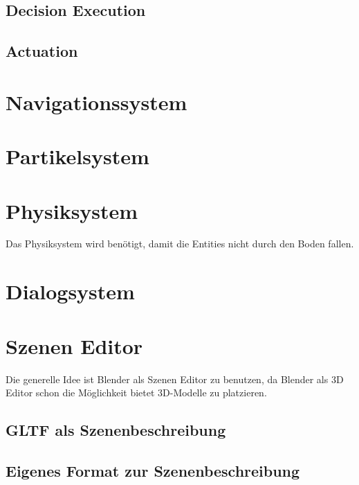 \subsection{Decision Execution}
\subsection{Actuation}

\section{Navigationssystem}

\section{Partikelsystem}

\section{Physiksystem}

Das Physiksystem wird benötigt, damit die Entities nicht durch den Boden fallen. 

\section{Dialogsystem}

\section{Szenen Editor}

Die generelle Idee ist Blender als Szenen Editor zu benutzen, da Blender als 3D Editor schon die Möglichkeit bietet 3D-Modelle zu platzieren.

\subsection{GLTF als Szenenbeschreibung}

\subsection{Eigenes Format zur Szenenbeschreibung}